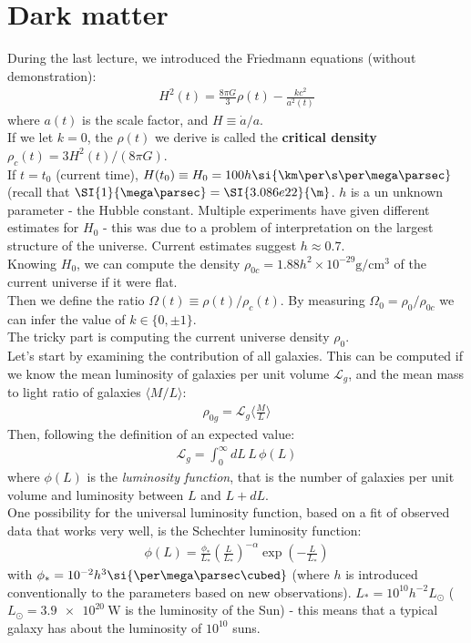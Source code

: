 \documentclass[../PhysUniverse.tex]{subfiles}
\begin{document}
\section{Dark matter}
During the last lecture, we introduced the Friedmann equations (without demonstration):
\begin{align*}
H^2(t) = \frac{8\pi G}{3} \rho(t) - \frac{kc^2}{a^2(t)}
\end{align*}
where $a(t)$ is the scale factor, and $H\equiv \dot{a}/a$.\\
If we let $k=0$, the $\rho(t)$ we derive is called the \textbf{critical density} $\rho_c(t) = 3H^2(t)/(8\pi G)$.\\
If $t=t_0$ (current time), $H(t_0)\equiv H_0 = 100 h \si{\km\per\s\per\mega\parsec}$ (recall that $\SI{1}{\mega\parsec}=\SI{3.086e22}{\m}$. $h$ is a un unknown parameter - the Hubble constant. Multiple experiments have given different estimates for $H_0$ - this was due to a problem of interpretation on the largest structure of the universe. Current estimates suggest $h\approx 0.7$.\\
Knowing $H_0$, we can compute the density $\rho_{0c} =1.88h^2\times 10^{-29}\si{\g\per\centi\m\cubed}$ of the current universe if it were flat.\\
Then we define the ratio $\Omega(t) \equiv \rho(t)/\rho_c(t)$. By measuring $\Omega_0 = \rho_0/\rho_{0c}$ we can infer the value of $k \in \{0,\pm 1\}$.\\

The tricky part is computing the current universe density $\rho_0$.\\
Let's start by examining the contribution of all galaxies. This can be computed if we know the mean luminosity of galaxies per unit volume $\mathcal{L}_g$, and the mean mass to light ratio of galaxies $\langle M/L \rangle$:
\begin{align*}
\rho_{0g} = \mathcal{L}_g\langle\frac{M}{L}\rangle
\end{align*}
Then, following the definition of an expected value:
\begin{align*}
\mathcal{L}_g = \int_0^{\infty} dL\, L\, \phi(L)
\end{align*}
where $\phi(L)$ is the \textit{luminosity function}, that is the number of galaxies per unit volume and luminosity between $L$ and $L+dL$.\\
One possibility for the universal luminosity function, based on a fit of observed data that works very well, is the Schechter luminosity function:
\begin{align*}
\phi(L) = \frac{\phi_*}{L_*} \left(\frac{L}{L_*}\right)^{-\alpha} \exp\left(-\frac{L}{L_*}\right)
\end{align*}
with $\phi_* = 10^{-2}h^3 \si{\per\mega\parsec\cubed}$ (where $h$ is introduced conventionally to  the parameters based on new observations). $L_* = 10^{10} h^{-2}L_\odot$ ($L_\odot = \SI{3.9e20}{\watt}$ is the luminosity of the Sun) - this means that a typical galaxy has about the luminosity of $10^{10}$ suns.\\
\end{document}
